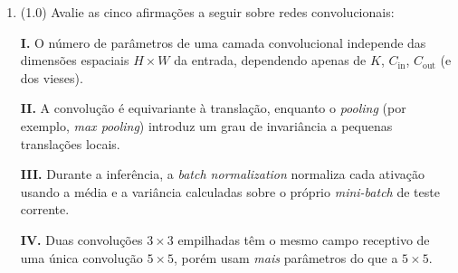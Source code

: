 \documentclass[11pt,a4paper]{article}
\begin{document}
\begin{enumerate}[1)]
\begin{enumerate}[(i)]
    \item convolução $K = 5$, \textit{stride} $S = 1$, \textit{padding} $P = 0$;
    \item \textit{max pooling} $2 \times 2$, \textit{stride} $S = 2$, \textit{padding} $P = 0$;
    \item convolução $K = 3$, \textit{stride} $S = 1$, \textit{padding} $P = 1$;
    \item \textit{max pooling} $2 \times 2$, \textit{stride} $S = 2$, \textit{padding} $P = 0$;
    \item convolução $K = 3$, \textit{stride} $S = 2$, \textit{padding} $P = 1$.
\end{enumerate}

Qual a dimensão espacial (em \textit{pixels}) do mapa de ativação (\textit{feature map}) na saída da camada (v)?

\begin{enumerate}[a)]
    \item $9 \times 9$
    \item $7 \times 7$
    \item $16 \times 16$
    \item $15 \times 15$
    \item $6 \times 6$
    \item $8 \times 8$
    \item $4 \times 4$
    \item $30 \times 30$
\end{enumerate}

\item (1.0) Avalie as cinco afirmações a seguir sobre redes convolucionais:

\textbf{I.} O número de parâmetros de uma camada convolucional independe das dimensões espaciais $H \times W$ da entrada, dependendo apenas de $K$, $C_{\text{in}}$, $C_{\text{out}}$ (e dos vieses).

\textbf{II.} A convolução é equivariante à translação, enquanto o \textit{pooling} (por exemplo, \textit{max pooling}) introduz um grau de invariância a pequenas translações locais.

\textbf{III.} Durante a inferência, a \textit{batch normalization} normaliza cada ativação usando a média e a variância calculadas sobre o próprio \textit{mini-batch} de teste corrente.

\textbf{IV.} Duas convoluções $3 \times 3$ empilhadas têm o mesmo campo receptivo de uma única convolução $5 \times 5$, porém usam \emph{mais} parâmetros do que a $5 \times 5$.


\end{enumerate}
\end{document}
